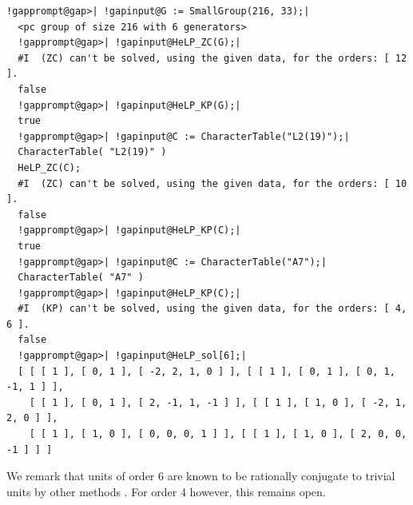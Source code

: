\documentclass[a4paper,11pt]{report}
\begin{document}
{{ 
\begin{Verbatim}[commandchars=!@|,fontsize=\small,frame=single,label=Example]
  !gapprompt@gap>| !gapinput@G := SmallGroup(216, 33);|
  <pc group of size 216 with 6 generators>
  !gapprompt@gap>| !gapinput@HeLP_ZC(G);|
  #I  (ZC) can't be solved, using the given data, for the orders: [ 12 ].
  false
  !gapprompt@gap>| !gapinput@HeLP_KP(G);|
  true
  !gapprompt@gap>| !gapinput@C := CharacterTable("L2(19)");|
  CharacterTable( "L2(19)" )
  HeLP_ZC(C);
  #I  (ZC) can't be solved, using the given data, for the orders: [ 10 ].
  false
  !gapprompt@gap>| !gapinput@HeLP_KP(C);|
  true
  !gapprompt@gap>| !gapinput@C := CharacterTable("A7");|
  CharacterTable( "A7" )
  !gapprompt@gap>| !gapinput@HeLP_KP(C);|
  #I  (KP) can't be solved, using the given data, for the orders: [ 4, 6 ].
  false
  !gapprompt@gap>| !gapinput@HeLP_sol[6];|
  [ [ [ 1 ], [ 0, 1 ], [ -2, 2, 1, 0 ] ], [ [ 1 ], [ 0, 1 ], [ 0, 1, -1, 1 ] ], 
    [ [ 1 ], [ 0, 1 ], [ 2, -1, 1, -1 ] ], [ [ 1 ], [ 1, 0 ], [ -2, 1, 2, 0 ] ], 
    [ [ 1 ], [ 1, 0 ], [ 0, 0, 0, 1 ] ], [ [ 1 ], [ 1, 0 ], [ 2, 0, 0, -1 ] ] ]
\end{Verbatim}
 We remark that units of order 6 are known to be rationally conjugate to
trivial units by other methods \cite{BachleMargolisExamplesToMethods}. For order 4 however, this remains open. }

 }

   
\end{document}
